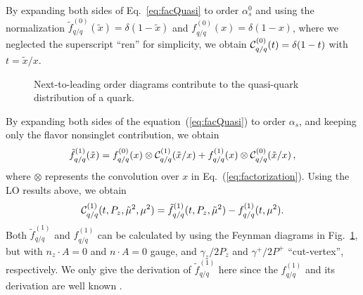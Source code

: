 \documentclass[twocolumn,aps,prl,superscriptaddress,nofootinbib,showpacs]{revtex4-1}
\begin{document}
By expanding both sides of Eq.~\eqref{eq:facQuasi} to order $\alpha_s^0$ and using the normalization $\tilde{f}^{(0)}_{q/q}(\tilde{x}) = \delta(1-\tilde{x})$ and $f^{(0)}_{q/q}(x) = \delta(1-x)$, where we neglected the superscript ``ren'' for simplicity, we obtain ${\cal C}_{q/q}^{(0)}({t})= \delta(1-{t})$ with ${t}=\tilde{x}/x$.
\begin{figure}[h]
\caption{\label{fig:quasi-quark-lo}
Next-to-leading order diagrams contribute to the quasi-quark distribution of a quark.}
\end{figure}
By expanding both sides of the equation~(\ref{eq:facQuasi}) to order $\alpha_s$, and keeping only the flavor nonsinglet contribution, we obtain
\begin{eqnarray}
\tilde{f}_{q/q}^{(1)}(\tilde{x})
=
f^{(0)}_{q/q}(x) \otimes
{\cal C}_{q/q}^{(1)}(\tilde{x}/x)
+
f^{(1)}_{q/q}(x) \otimes
{\cal C}_{q/q}^{(0)}(\tilde{x}/x)\, ,
\label{eq:1st}
\end{eqnarray}
where $\otimes$ represents the convolution over $x$ in Eq.~(\ref{eq:factorization}).
Using the LO results above, we obtain
\begin{eqnarray}
{\cal C}_{q/q}^{(1)}({t},P_z,\tilde{\mu}^2,\mu^2)
=\tilde{f}_{q/q}^{(1)}({t},P_z,\tilde{\mu}^2)-f_{q/q}^{(1)}({t},\mu^2).
\label{eq:cqq1}
\end{eqnarray}
Both $\tilde{f}_{q/q}^{(1)}$ and ${f}_{q/q}^{(1)}$ can be calculated by using the Feynman diagrams in Fig.~\ref{fig:quasi-quark-lo}, but with $n_z\cdot A=0$ and $n\cdot A=0$ gauge, and $\gamma_z/2P_z$ and $\gamma^+/2P^+$ ``cut-vertex'', respectively.  We only give the derivation of $\tilde{f}_{q/q}^{(1)}$ here since the $f_{q/q}^{(1)}$ and its derivation are well known \cite{Collins:1981uw}.
\end{document}
